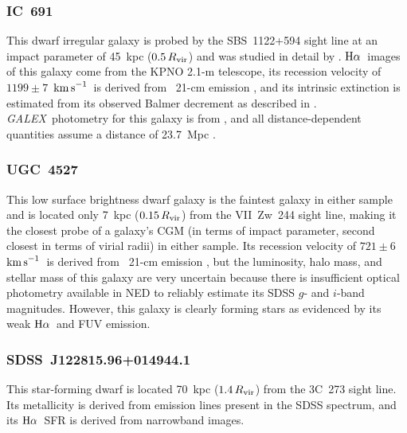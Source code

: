 \documentclass[twocolumn,twocolappendix,tighten,times]{aastex6}
\newcommand{\HI}{\ion{H}{1}}
\newcommand{\galex}{{\sl GALEX}}
\newcommand{\Ha}{\ensuremath{{\rm H}\alpha}}
\newcommand{\kms}{\ensuremath{{\rm km\,s}^{-1}}}
\begin{document}


\subsubsection{IC~691}
\label{indiv:galaxies:ic691}

This dwarf irregular galaxy is probed by the SBS~1122+594 sight line
at an impact  parameter of 45~kpc ($0.5\,R_{\rm vir}$) and was studied
in detail by \citet{keeney06}. \Ha\ images of this galaxy come from
the KPNO 2.1-m telescope, its recession velocity of
$1199\pm7$~\kms\ is derived from \HI\ 21-cm emission
\citep{devaucouleurs91}, and its intrinsic extinction is estimated
from its observed Balmer decrement as described in \citet{calzetti01}. 
\galex\ photometry for this galaxy is from  \citet{hao11}, and all 
distance-dependent quantities assume a distance of 23.7~Mpc \citep{tully88}.


\subsubsection{UGC~4527}
\label{indiv:galaxies:ugc4527}

This low surface brightness dwarf galaxy is the faintest galaxy in either 
sample and is located only 7~kpc ($0.15\,R_{\rm vir}$) from the VII~Zw~244
sight line, making it the closest probe of a galaxy's CGM (in terms
of impact parameter, second closest in terms of  virial radii) in
either sample. Its recession velocity of $721\pm6$~\kms\ is derived
from \HI\ 21-cm emission \citep{schneider92}, but the luminosity, halo
mass, and stellar mass of this galaxy are very uncertain because
there is insufficient optical photometry available in NED to reliably
estimate its SDSS $g$- and $i$-band magnitudes.  However, this galaxy
is clearly forming stars as evidenced by its weak \Ha\ and FUV
emission.



\subsubsection{SDSS~J122815.96+014944.1}
\label{indiv:galaxies:sdssj1228+01}

This star-forming dwarf is located 70~kpc ($1.4\,R_{\rm vir}$) from the 3C~273 
sight line. Its metallicity is derived from emission lines present in the SDSS spectrum, and its \Ha\ SFR is derived from narrowband images.
\end{document}
